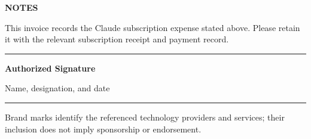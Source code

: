 \documentclass[10pt,a4paper]{article}
\newcommand{\fieldlabel}[1]{{\fontsize{7.5}{9}\selectfont\bfseries\color{TextGray}\MakeUppercase{#1}}}
\begin{document}
\vspace{5mm}

\vfill
\begin{minipage}[b]{0.45\textwidth}
  \fieldlabel{Notes}\par
  \vspace{1.5mm}
  {\footnotesize\color{TextGray}
  This invoice records the Claude subscription expense stated above. Please retain it with the relevant subscription receipt and payment record.}
\end{minipage}%
\hfill
\begin{minipage}[b]{0.38\textwidth}
  \centering
  \vspace{10mm}
  {\color{RuleGray}\rule{0.88\textwidth}{0.6pt}}\par
  \vspace{1.5mm}
  {\small\bfseries\color{Navy}Authorized Signature}\par
  {\footnotesize\color{TextGray}Name, designation, and date}
\end{minipage}

\vspace{5mm}
{\color{RuleGray}\rule{\textwidth}{0.5pt}}\par
\vspace{1.5mm}
{\centering\fontsize{6.8}{8}\selectfont\color{TextGray}
Brand marks identify the referenced technology providers and services; their inclusion does not imply sponsorship or endorsement.\par}
\end{document}

